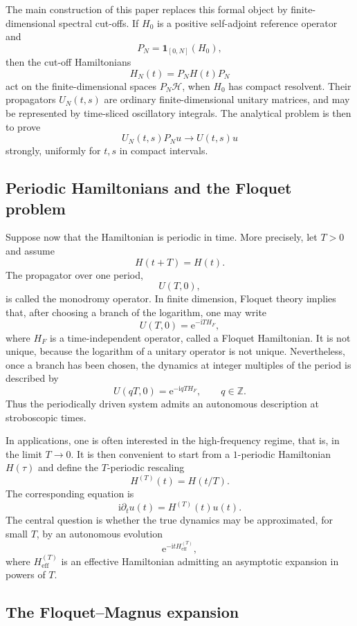 \documentclass[11pt]{amsart}
\theoremstyle{plain}
\theoremstyle{definition}
\theoremstyle{remark}
\newcommand{\Hilb}{\mathcal H}
\newcommand{\ii}{\mathrm i}
\newcommand{\ee}{\mathrm e}
\begin{document}
The main construction of this paper replaces this formal object by
finite-dimensional spectral cut-offs.  If \(H_0\) is a positive
self-adjoint reference operator and
\[
        P_N=\mathbf 1_{[0,N]}(H_0),
\]
then the cut-off Hamiltonians
\[
        H_N(t)=P_NH(t)P_N
\]
act on the finite-dimensional spaces \(P_N\Hilb\), when \(H_0\) has
compact resolvent.  Their propagators \(U_N(t,s)\) are ordinary
finite-dimensional unitary matrices, and may be represented by
time-sliced oscillatory integrals.  The analytical problem is then to
prove
\[
        U_N(t,s)P_Nu \longrightarrow U(t,s)u
\]
strongly, uniformly for \(t,s\) in compact intervals.

\subsection{Periodic Hamiltonians and the Floquet problem}

Suppose now that the Hamiltonian is periodic in time.  More precisely,
let \(T>0\) and assume
\[
        H(t+T)=H(t).
\]
The propagator over one period,
\[
        U(T,0),
\]
is called the monodromy operator.  In finite dimension, Floquet theory
implies that, after choosing a branch of the logarithm, one may write
\[
        U(T,0)=\ee^{-\ii T H_F},
\]
where \(H_F\) is a time-independent operator, called a Floquet
Hamiltonian.  It is not unique, because the logarithm of a unitary
operator is not unique.  Nevertheless, once a branch has been chosen,
the dynamics at integer multiples of the period is described by
\[
        U(qT,0)=\ee^{-\ii qT H_F},
        \qquad q\in\mathbb Z.
\]
Thus the periodically driven system admits an autonomous description at
stroboscopic times.

In applications, one is often interested in the high-frequency regime,
that is, in the limit \(T\to0\).  It is then convenient to start from a
\(1\)-periodic Hamiltonian \(H(\tau)\) and define the \(T\)-periodic
rescaling
\[
        H^{(T)}(t)=H(t/T).
\]
The corresponding equation is
\[
        \ii\partial_t u(t)=H^{(T)}(t)u(t).
\]
The central question is whether the true dynamics may be approximated,
for small \(T\), by an autonomous evolution
\[
        \ee^{-\ii t H_{\mathrm{eff}}^{(T)}},
\]
where \(H_{\mathrm{eff}}^{(T)}\) is an effective Hamiltonian admitting an
asymptotic expansion in powers of \(T\).

\subsection{The Floquet--Magnus expansion}
\end{document}
